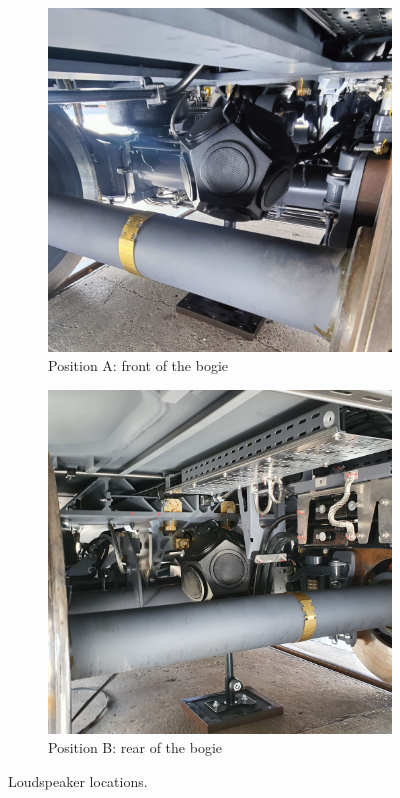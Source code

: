 \begin{figure}[H]
     \centering
     \begin{subfigure}[b]{0.4\textwidth}
         \centering
         \includegraphics[width=\linewidth]{fig/loudspeaker_position_A.jpg}
         \caption{Position A: front of the bogie}
     \end{subfigure}
     \hspace{0.1\textwidth}
     \begin{subfigure}[b]{0.4\textwidth}
         \centering
         \includegraphics[width=\linewidth]{fig/loudspeaker_position_B.jpg}
         \caption{Position B: rear of the bogie}
     \end{subfigure}
     \caption{Loudspeaker locations.}
     \label{fig:loudspeakerposition}
\end{figure}

